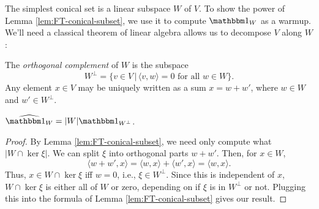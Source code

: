 The simplest conical set is a linear subspace $W$ of $V$.
To show the power of Lemma \ref{lem:FT-conical-subset}, we use it to compute $\IND_W$
as a warmup. We'll need a classical theorem of linear algebra allows us to decompose $V$
along $W$:
\begin{prop}
    The \emph{orthogonal complement} of $W$ is the subspace    
    \[ W^\perp = \{ v \in V \,|\, \langle v, w \rangle = 0 \text{ for all } w \in W \}. \]
    Any element $x\in V$ may be uniquely written as a sum $x = w + w'$, where $w\in W$
    and $w'\in W^\perp$.
\end{prop}

\begin{thm}\label{thm:FT-subspace}
    $\widehat{\IND_W} = |W| \IND_{W^\perp}$.
    \begin{proof}
        By Lemma \ref{lem:FT-conical-subset}, we need only compute what 
        $|W\cap\ker\xi|$. We can split $\xi$ into orthogonal parts $w + w'$.
        Then, for $x\in W$,
        \[ \langle w + w', x \rangle = \langle w, x \rangle + \langle w', x \rangle
            = \langle w, x \rangle. \]
        Thus, $x\in W\cap\ker\xi$ iff $w = 0$, i.e., $\xi\in W^\perp$. Since
        this is independent of $x$, $W\cap\ker\xi$ is either all of $W$ or zero,
        depending on if $\xi$ is in $W^\perp$ or not. Plugging this into the
        formula of Lemma \ref{lem:FT-conical-subset} gives our result.
    \end{proof}
\end{thm}